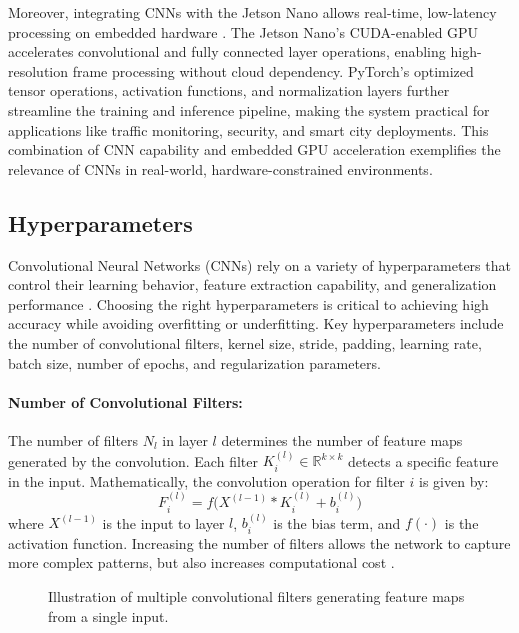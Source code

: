 Moreover, integrating CNNs with the Jetson Nano allows real-time, low-latency processing on embedded hardware \cite{jetsonpytorch, pytorchdocs}. The Jetson Nano’s CUDA-enabled GPU accelerates convolutional and fully connected layer operations, enabling high-resolution frame processing without cloud dependency. PyTorch’s optimized tensor operations, activation functions, and normalization layers further streamline the training and inference pipeline, making the system practical for applications like traffic monitoring, security, and smart city deployments. This combination of CNN capability and embedded GPU acceleration exemplifies the relevance of CNNs in real-world, hardware-constrained environments.


\subsection{Hyperparameters}

Convolutional Neural Networks (CNNs) rely on a variety of hyperparameters that control their learning behavior, feature extraction capability, and generalization performance \cite{goodfellow2016deep, pinto2022springer}. Choosing the right hyperparameters is critical to achieving high accuracy while avoiding overfitting or underfitting. Key hyperparameters include the number of convolutional filters, kernel size, stride, padding, learning rate, batch size, number of epochs, and regularization parameters.

\paragraph{Number of Convolutional Filters:}  
The number of filters \(N_l\) in layer \(l\) determines the number of feature maps generated by the convolution. Each filter \(K_i^{(l)} \in \mathbb{R}^{k \times k}\) detects a specific feature in the input. Mathematically, the convolution operation for filter \(i\) is given by:
\[
F_i^{(l)} = f\big(X^{(l-1)} * K_i^{(l)} + b_i^{(l)}\big)
\]
where \(X^{(l-1)}\) is the input to layer \(l\), \(b_i^{(l)}\) is the bias term, and \(f(\cdot)\) is the activation function. Increasing the number of filters allows the network to capture more complex patterns, but also increases computational cost \cite{pytorchdocs}.

\begin{figure}[H]
	\centering
	
	\caption{Illustration of multiple convolutional filters generating feature maps from a single input.}
\end{figure}

